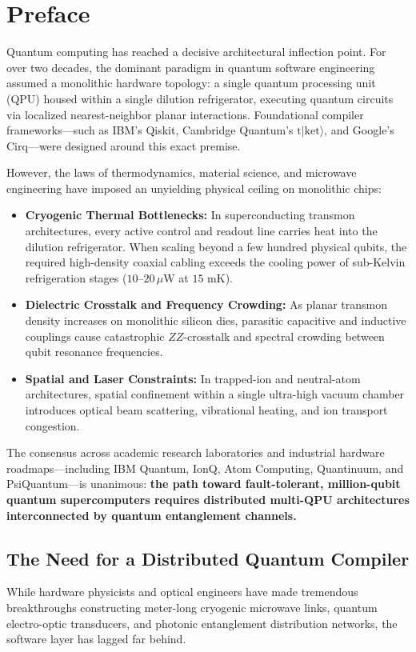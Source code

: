 \chapter*{Preface}


Quantum computing has reached a decisive architectural inflection point. For over two decades, the dominant paradigm in quantum software engineering assumed a monolithic hardware topology: a single quantum processing unit (QPU) housed within a single dilution refrigerator, executing quantum circuits via localized nearest-neighbor planar interactions. Foundational compiler frameworks---such as IBM's Qiskit, Cambridge Quantum's $\text{t}|\text{ket}\rangle$, and Google's Cirq---were designed around this exact premise.

However, the laws of thermodynamics, material science, and microwave engineering have imposed an unyielding physical ceiling on monolithic chips:
\begin{itemize}
    \item \textbf{Cryogenic Thermal Bottlenecks:} In superconducting transmon architectures, every active control and readout line carries heat into the dilution refrigerator. When scaling beyond a few hundred physical qubits, the required high-density coaxial cabling exceeds the cooling power of sub-Kelvin refrigeration stages ($10\text{--}20\,\mu\text{W}$ at $15\text{ mK}$).
    \item \textbf{Dielectric Crosstalk and Frequency Crowding:} As planar transmon density increases on monolithic silicon dies, parasitic capacitive and inductive couplings cause catastrophic $ZZ$-crosstalk and spectral crowding between qubit resonance frequencies.
    \item \textbf{Spatial and Laser Constraints:} In trapped-ion and neutral-atom architectures, spatial confinement within a single ultra-high vacuum chamber introduces optical beam scattering, vibrational heating, and ion transport congestion.
\end{itemize}

The consensus across academic research laboratories and industrial hardware roadmaps---including IBM Quantum, IonQ, Atom Computing, Quantinuum, and PsiQuantum---is unanimous: \textbf{the path toward fault-tolerant, million-qubit quantum supercomputers requires distributed multi-QPU architectures interconnected by quantum entanglement channels.}

\section*{The Need for a Distributed Quantum Compiler}
While hardware physicists and optical engineers have made tremendous breakthroughs constructing meter-long cryogenic microwave links, quantum electro-optic transducers, and photonic entanglement distribution networks, the software layer has lagged far behind. 

